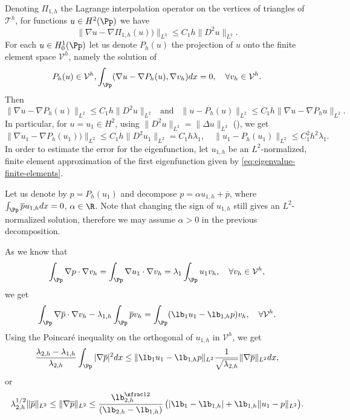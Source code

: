 Denoting $\Pi_{1,h}$ the Lagrange interpolation operator on the vertices of triangles of~${\mathcal T}^h$, for functions $u \in H^2(\Pp)$ we have
\[
\|\nabla u-\nabla \Pi_{1,h} (u)) \|_{L^2} \le C_1 h \|D^2 u\|_{L^2}.
\]
For each $u \in H^1_0(\Pp)$ let us denote $P_h(u)$ the projection of $u$ onto the finite element space $\mathcal V^h$, namely the solution of
\begin{equation}
P_h(u) \in \mathcal V^h, \int_{\Pp} (\nabla u- \nabla P_h(u), \nabla v_h)dx =0,\ \ \ \forall v_h \in \mathcal V^h.
\label{eq:projection-h}
\end{equation}
Then
\begin{equation}\label{eq:u-phu}
\|\nabla u- \nabla P_h(u) \|_{L^2} \le C_1 h \|D^2 u\|_{L^2} \ \ \text{ and } \ \ \|u-P_h(u)\|_{L^2} \leq C_1h \|\nabla u- \nabla P_hu\|_{L^2}.
\end{equation}
In particular, for $u = u_1 \in H^2$, using $\|D^2u\|_{L^2} = \|\Delta u\|_{L^2}$ (\cite[Th.\,4.3.1.4]{grisvard}), we get
\begin{equation}\label{eq:error_xuefeng}
\|\nabla u_1-\nabla P_h(u_1)) \|_{L^2} \le C_1 h \|D^2 u_1\|_{L^2} = C_1 h\lambda_1,\quad \|u_1-P_h(u_1)\|_{L^2} \leq C_1^2h^2 \lambda_1.
\end{equation}
In order to estimate the error for the eigenfunction, let $u_{1,h}$ be an $L^2$-normalized, finite element approximation of the first eigenfunction given by \eqref{eq:eigenvalue-finite-elements}.

Let us denote by $p= P_h(u_1)$ and decompose $p= \alpha u_{1,h}+ \overline p$, where $\int_ {\Pp} \overline p u_{1,h} dx =0$, $\alpha \in \R$. Note that changing the sign of $u_{1,h}$ still gives an $L^2$-normalized solution, therefore we may assume $\alpha>0$ in the previous decomposition.

As we know that
\[
\int_\Pp \nabla p \cdot \nabla v_h = \int_\Pp \nabla u_1 \cdot \nabla v_h = \lambda_1\int_\Pp u_1v_h, \ \ \ \forall v_h \in \mathcal V^h,
\]
we get
\[
\int_\Pp \nabla \overline p \cdot \nabla v_h - \lambda_{1,h} \int_\Pp \overline p v_h = \int_{\Pp} (\lb_1 u_1- \lb_{1, h}p)v_h, \ \ \ \forall \mathcal V^h.
\]
Using the Poincaré inequality on the orthogonal of $u_{1,h}$ in $\mathcal V^h$, we get
\[
\frac{\lambda_{2,h}-\lambda_{1,h}}{\lambda_{2,h}}\int_{\Pp} |\nabla \overline p|^2 dx \le \| \lb_1 u_1- \lb_{1, h}p\|_{L^2} \frac{1}{\sqrt{\lambda_{2,h}}} \|\nabla \overline p\|_{L^2} dx,
\]
or
\begin{equation}
\lambda_{2,h}^{1/2}\|\overline p\|_{L^2} \leq \|\nabla \overline p \|_{L^2} \le \frac{\lb_{2, h}^{\sfrac 12}}{(\lb_{2, h}-\lb_{1, h})}\,\big (|\lb_1-\lb_{1, h}|+ \lb_{1, h}\|u_1- p\|_{L^2}\big).
\label{eq:estimate-p-bar}
\end{equation}

